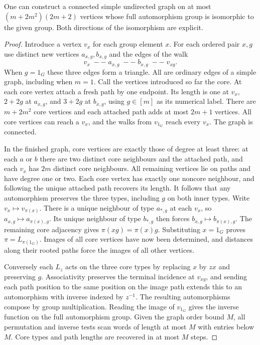 \begin{theorem}\leavevmode\label{co:frucht}
One can construct a connected simple undirected graph on at most
$(m+2m^2)(2m+2)$ vertices whose full automorphism group is isomorphic
to the given group. Both directions of the isomorphism are explicit.
\end{theorem}
\begin{proof}
Introduce a vertex $v_x$ for each group element $x$. For each ordered
pair $x,g$ use distinct new vertices $a_{x,g},b_{x,g}$ and the edges
of the walk
\[
 v_x\;--\; a_{x,g}\;--\; b_{x,g}\;--\; v_{xg}.
\]
When $g=1_G$ these three edges form a triangle. All are ordinary
edges of a simple graph, including when $m=1$. Call the vertices
introduced so far the core. At each core vertex attach a fresh path
by one endpoint. Its length is one at $v_x$, $2+2g$ at $a_{x,g}$,
and $3+2g$ at $b_{x,g}$, using $g\in[m]$ as its numerical label.
There are $m+2m^2$ core vertices and each attached path adds at most
$2m+1$ vertices. All core vertices can reach a $v_x$, and the walks
from $v_{1_G}$ reach every $v_x$. The graph is connected.

In the finished graph, core vertices are exactly those of degree at
least three: at each $a$ or $b$ there are two distinct core neighbours
and the attached path, and each $v_x$ has $2m$ distinct core neighbours.
All remaining vertices lie on paths and have degree one or two.
Each core vertex has exactly one noncore neighbour, and following the
unique attached path recovers its length. It follows that any automorphism
preserves the three types, including $g$ on both inner types. Write
$v_x\mapsto v_{\pi(x)}$. There is a unique neighbour of type $a_{*,g}$
at each $v_x$, so $a_{x,g}\mapsto a_{\pi(x),g}$. Its unique neighbour
of type $b_{*,g}$ then forces $b_{x,g}\mapsto b_{\pi(x),g}$. The
remaining core adjacency gives $\pi(xg)=\pi(x)g$. Substituting
$x=1_G$ proves $\pi=L_{\pi(1_G)}$. Images of all core vertices have now
been determined, and distances along their rooted paths force the images
of all other vertices.

Conversely each $L_z$ acts on the three core types by replacing $x$ by
$zx$ and preserving $g$. Associativity preserves the terminal incidence
at $v_{xg}$, and sending each path position to the same position on the
image path extends this to an automorphism with inverse indexed by $z^{-1}$.
The resulting automorphisms compose by group multiplication. Reading
the image of $v_{1_G}$ gives the inverse function on the full
automorphism group. Given the graph order bound $M$, all permutation and
inverse tests scan words of length at most $M$ with entries below $M$.
Core types and path lengths are recovered in at most $M$ steps.
\end{proof}
